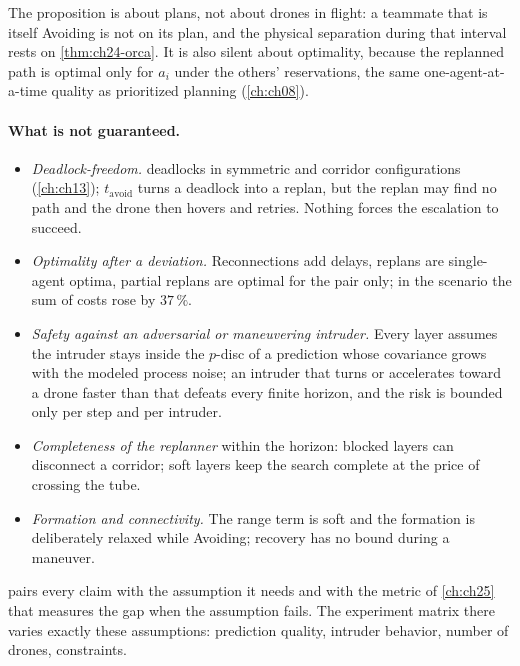 The proposition is about plans, not about drones in flight: a teammate that
is itself Avoiding is not on its plan, and the physical separation during
that interval rests on \cref{thm:ch24-orca}. It is also silent about
optimality, because the replanned path is optimal only for $a_i$ under the
others' reservations, the same one-agent-at-a-time quality as prioritized
planning (\cref{ch:ch08}).

\paragraph{What is not guaranteed.}
\begin{itemize}
  \item \emph{Deadlock-freedom.} \orca deadlocks in symmetric and corridor
  configurations (\cref{ch:ch13}); $t_{\mathrm{avoid}}$ turns a deadlock into
  a replan, but the replan may find no path and the drone then hovers and
  retries. Nothing forces the escalation to succeed.
  \item \emph{Optimality after a deviation.} Reconnections add delays,
  replans are single-agent optima, partial replans are optimal for the pair
  only; in the scenario the sum of costs rose by $37\,\%$.
  \item \emph{Safety against an adversarial or maneuvering intruder.} Every
  layer assumes the intruder stays inside the $p$-disc of a prediction whose
  covariance grows with the modeled process noise; an intruder that turns
  or accelerates toward a drone faster than that defeats every finite
  horizon, and the risk is bounded only per step and per intruder.
  \item \emph{Completeness of the replanner} within the horizon: blocked
  layers can disconnect a corridor; soft layers keep the search complete at
  the price of crossing the tube.
  \item \emph{Formation and connectivity.} The range term is soft and the
  formation is deliberately relaxed while Avoiding; recovery has no bound
  during a maneuver.
\end{itemize}
 pairs every claim with the assumption it needs and
with the metric of \cref{ch:ch25} that measures the gap when the assumption
fails. The experiment matrix there varies exactly these assumptions:
prediction quality, intruder behavior, number of drones, constraints.

